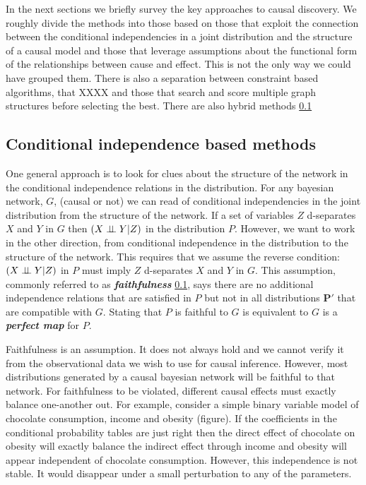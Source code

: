 \documentclass[11pt,a4paper,oneside]{book}
\theoremstyle{plain}
\theoremstyle{definition}
\begin{document}
In the next sections we briefly survey the key approaches to causal discovery. We roughly divide the methods into those based on those that exploit the connection between the conditional independencies in a joint distribution and the structure of a causal model and those that leverage assumptions about the functional form of the relationships between cause and effect. This is not the only way we could have grouped them. There is also a separation between constraint based algorithms, that XXXX and those that search and score multiple graph structures before selecting the best. There are also hybrid methods \ref{}  

\subsection{Conditional independence based methods}
One general approach is to look for clues about the structure of the network in the conditional independence relations in the distribution. For any bayesian network, $G$, (causal or not) we can read of conditional independencies in the joint distribution from the structure of the network. If a set of variables $Z$ d-separates $X$ and $Y$ in $G$ then $(X \perp\!\!\!\perp Y|Z)$ in the distribution $P$. However, we want to work in the other direction, from conditional independence in the distribution to the structure of the network. This requires that we assume the reverse condition: $(X \perp\!\!\!\perp Y|Z)$ in $P$ must imply $Z$ d-separates $X$ and $Y$ in $G$. This assumption, commonly referred to as  \textbf{\textit{faithfulness}} \ref{}, says there are no additional independence relations that are satisfied in $P$ but not in all distributions $\boldsymbol{P'}$ that are compatible with $G$. Stating that $P$ is faithful to $G$ is equivalent to $G$ is a \textbf{\textit{perfect map}} \cite{Kollner} for $P$.

Faithfulness is an assumption. It does not always hold and we cannot verify it from the observational data we wish to use for causal inference. However, most distributions generated by a causal bayesian network will be faithful to that network. For faithfulness to be violated, different causal effects must exactly balance one-another out. For example, consider a simple binary variable model of chocolate consumption, income and obesity (figure). If the coefficients in the conditional probability tables are just right then the direct effect of chocolate on obesity will exactly balance the indirect effect through income and obesity will appear independent of chocolate consumption. However, this independence is not stable. It would disappear under a small perturbation to any of the parameters.   
\end{document}
